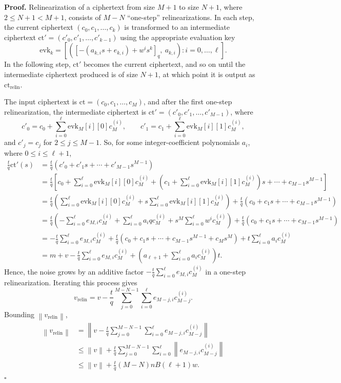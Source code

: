 \documentclass[11pt]{article}
\newcommand{\norm}[1]{\left\lVert #1\right\rVert}
\newcommand{\ct}{\mathrm{ct}}
\newcommand{\ctrelin}{\mathrm{ct}_{\mathrm{relin}}}
\newcommand{\vrelin}{v_{\mathrm{relin}}}
\begin{document}
\textbf{Proof.}
Relinearization of a ciphertext from size $M+1$ to size $N+1$,
where $2\leq N+1<M+1$, consists of $M-N$ ``one-step''
relinearizations. In each step, the current ciphertext
$(c_0,c_1,\ldots,c_k)$ is transformed to an intermediate ciphertext
$\ct'=(c'_0,c'_1,\ldots,c'_{k-1})$ using the appropriate evaluation key
\[
 \mathrm{evk}_k=
 \left[
   \left([-(a_{k,i}s+e_{k,i})+w^is^k]_q,\ a_{k,i}\right)
   : i=0,\ldots,\ell
 \right].
\]
In the following step, $\ct'$ becomes the current ciphertext, and so on
until the intermediate ciphertext produced is of size $N+1$, at which
point it is output as $\ctrelin$.

The input ciphertext is $\ct=(c_0,c_1,\ldots,c_M)$, and after the
first one-step relinearization, the intermediate ciphertext is
$\ct'=(c'_0,c'_1,\ldots,c'_{M-1})$, where
\[
 c'_0=c_0+\sum_{i=0}^{\ell}\mathrm{evk}_M[i][0]c_M^{(i)},
 \qquad
 c'_1=c_1+\sum_{i=0}^{\ell}\mathrm{evk}_M[i][1]c_M^{(i)},
\]
and $c'_j=c_j$ for $2\leq j\leq M-1$.
So, for some integer-coefficient polynomials $a_i$, where
$0\leq i\leq \ell+1$,
\begin{align*}
\frac{t}{q}\ct'(s)
&=\frac{t}{q}(c'_0+c'_1s+\cdots+c'_{M-1}s^{M-1})\\
&=\frac{t}{q}\left[
 c_0+\sum_{i=0}^{\ell}\mathrm{evk}_M[i][0]c_M^{(i)}
 +\left(c_1+\sum_{i=0}^{\ell}\mathrm{evk}_M[i][1]c_M^{(i)}\right)s
 +\cdots+c_{M-1}s^{M-1}
 \right]\\
&=\frac{t}{q}\left(
 \sum_{i=0}^{\ell}\mathrm{evk}_M[i][0]c_M^{(i)}
 +s\sum_{i=0}^{\ell}\mathrm{evk}_M[i][1]c_M^{(i)}
 \right)
 +\frac{t}{q}(c_0+c_1s+\cdots+c_{M-1}s^{M-1})\\
&=\frac{t}{q}\left(
 -\sum_{i=0}^{\ell}e_{M,i}c_M^{(i)}
 +\sum_{i=0}^{\ell}a_iqc_M^{(i)}
 +s^M\sum_{i=0}^{\ell}w^ic_M^{(i)}
 \right)
 +\frac{t}{q}(c_0+c_1s+\cdots+c_{M-1}s^{M-1})\\
&=-\frac{t}{q}\sum_{i=0}^{\ell}e_{M,i}c_M^{(i)}
 +\frac{t}{q}\left(c_0+c_1s+\cdots+c_{M-1}s^{M-1}+c_Ms^M\right)
 +t\sum_{i=0}^{\ell}a_ic_M^{(i)}\\
&=m+v-\frac{t}{q}\sum_{i=0}^{\ell}e_{M,i}c_M^{(i)}
 +\left(a_{\ell+1}+\sum_{i=0}^{\ell}a_ic_M^{(i)}\right)t.
\end{align*}
Hence, the noise grows by an additive factor
$-\frac{t}{q}\sum_{i=0}^{\ell}e_{M,i}c_M^{(i)}$
in a one-step relinearization. Iterating this process gives
\[
 \vrelin=v-\frac{t}{q}
 \sum_{j=0}^{M-N-1}\sum_{i=0}^{\ell}
 e_{M-j,i}c_{M-j}^{(i)}.
\]
Bounding $\norm{\vrelin}$,
\begin{align*}
\norm{\vrelin}
&=\left\lVert v-\frac{t}{q}
 \sum_{j=0}^{M-N-1}\sum_{i=0}^{\ell}
 e_{M-j,i}c_{M-j}^{(i)}\right\rVert\\
&\leq \norm{v}+\frac{t}{q}
 \sum_{j=0}^{M-N-1}\sum_{i=0}^{\ell}
 \norm{e_{M-j,i}c_{M-j}^{(i)}}\\
&\leq \norm{v}+\frac{t}{q}(M-N)nB(\ell+1)w.
\end{align*}
\hfill$\square$
\end{document}
